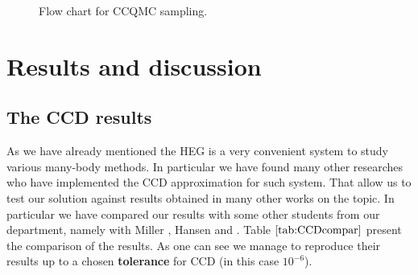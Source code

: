\documentclass[twoside,english]{uiofysmaster}
\theoremstyle{definition}
\begin{document}
\begin{figure}[!h]
\begin{center}
	\end{center}
	\caption{Flow chart for CCQMC sampling. } \label{figccqmcWF}
\end{figure}




\chapter{Results and discussion} \label{sec:Results}

\section{The CCD results}
As we have already mentioned the HEG is a very convenient system to study various many-body methods. In particular we have found many other researches who have implemented the CCD approximation for such system. That allow us to test our solution against results obtained in many other works on the topic. In particular we have compared our results with some other students from our department, namely with Miller \cite{millerAntumMechanicalStudies}, Hansen \cite{hansenCoupledClusterStudies} and \cite{gustavbaardsenCoupledclusterTheoryInfinite2014}. Table $\ref{tab:CCDcompar}$ present the comparison of the results. As one can see we manage to reproduce their results up to a chosen \textbf{tolerance} for CCD (in this case $10^{-6}$).
\end{document}
